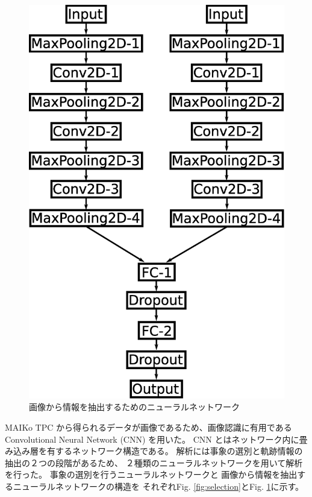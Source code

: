 \documentclass{jps-cp}
\begin{document}
\begin{figure}
  \centering
  \includegraphics[clip, width=15zw]{eps/point_detection.eps}
  \caption{画像から情報を抽出するためのニューラルネットワーク}
  \label{fig:extraction}
\end{figure}

MAIKo TPC から得られるデータが画像であるため、画像認識に有用であるConvolutional Neural Network (CNN) を用いた。
CNN とはネットワーク内に畳み込み層を有するネットワーク構造である。
解析には事象の選別と軌跡情報の抽出の２つの段階があるため、
２種類のニューラルネットワークを用いて解析を行った。
事象の選別を行うニューラルネットワークと
画像から情報を抽出するニューラルネットワークの構造を
それぞれFig. \ref{fig:selection}とFig. \ref{fig:extraction}に示す。
\end{document}
